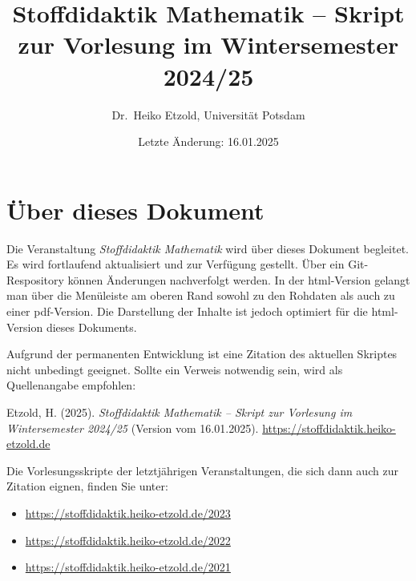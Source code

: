 \documentclass[
]{scrbook}
\title{Stoffdidaktik Mathematik -- Skript zur Vorlesung im Wintersemester 2024/25}
\author{Dr.~Heiko Etzold, Universität Potsdam}
\date{Letzte Änderung: 16.01.2025}
\makeatletter
\providecommand{\tightlist}{%
  \setlength{\itemsep}{0pt}\setlength{\parskip}{0pt}}
\renewenvironment{quote}{
  \list{}{
	\leftmargin0.2cm   %
    \rightmargin\leftmargin
      	\def\FrameCommand
    {%
        {\color{quoteColor}\vrule width 2pt}%
        \hspace{0pt}%
    }%
    \MakeFramed{\advance \hsize -\width \FrameRestore}    \color{quoteColor}
    }
  \item\relax
}
{\endlist\color{black}\endMakeFramed}
\def\renewtheorem#1{%
  \expandafter\let\csname#1\endcsname\relax
  \expandafter\let\csname c@#1\endcsname\relax
  \gdef\renewtheorem@envname{#1}
  \renewtheorem@secpar
}
\def\renewtheorem@secpar{\@ifnextchar[{\renewtheorem@numberedlike}{\renewtheorem@nonumberedlike}}
\def\renewtheorem@numberedlike[#1]#2{\newtheorem{\renewtheorem@envname}[#1]{#2}}
\def\renewtheorem@nonumberedlike#1{
\def\renewtheorem@caption{#1}
\edef\renewtheorem@nowithin{\noexpand\newtheorem{\renewtheorem@envname}{\renewtheorem@caption}}
\renewtheorem@thirdpar
}
\def\renewtheorem@thirdpar{\@ifnextchar[{\renewtheorem@within}{\renewtheorem@nowithin}}
\def\renewtheorem@within[#1]{\renewtheorem@nowithin[#1]}
\theoremstyle{definition}
\theoremstyle{definition}
\theoremstyle{definition}
\theoremstyle{definition}
\theoremstyle{remark}
\makeatother
\begin{document}
\maketitle

%

{
\hypersetup{linkcolor=}
\setcounter{tocdepth}{1}
\tableofcontents
}
\chapter*{Über dieses Dokument}\label{uxfcber-dieses-dokument}

Die Veranstaltung \emph{Stoffdidaktik Mathematik} wird über dieses Dokument begleitet. Es wird fortlaufend aktualisiert und zur Verfügung gestellt. Über ein Git-Respository können Änderungen nachverfolgt werden.
In der html-Version gelangt man über die Menüleiste am oberen Rand sowohl zu den Rohdaten als auch zu einer pdf-Version. Die Darstellung der Inhalte ist jedoch optimiert für die html-Version dieses Dokuments.

Aufgrund der permanenten Entwicklung ist eine Zitation des aktuellen Skriptes nicht unbedingt geeignet. Sollte ein Verweis notwendig sein, wird als Quellenangabe empfohlen:

\begin{quote}
Etzold, H. (2025). \emph{Stoffdidaktik Mathematik -- Skript zur Vorlesung im Wintersemester 2024/25} (Version vom 16.01.2025). \url{https://stoffdidaktik.heiko-etzold.de}
\end{quote}

Die Vorlesungsskripte der letztjährigen Veranstaltungen, die sich dann auch zur Zitation eignen, finden Sie unter:

\begin{itemize}
\tightlist
\item
  \url{https://stoffdidaktik.heiko-etzold.de/2023}
\item
  \url{https://stoffdidaktik.heiko-etzold.de/2022}
\item
  \url{https://stoffdidaktik.heiko-etzold.de/2021}
\end{itemize}
\end{document}
